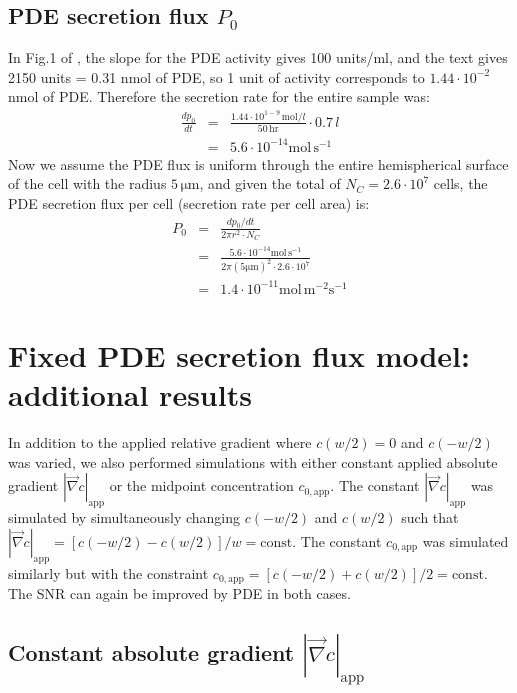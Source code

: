 \documentclass[10pt]{article}
\begin{document}
\subsection{PDE secretion flux $P_0$}

In Fig.1 of \cite{PdePdiKd}, the slope for the PDE activity gives
100 units/ml, and the text gives 2150 units = 0.31 nmol of PDE, so
1 unit of activity corresponds to $1.44\cdot10^{-2}$ nmol of PDE.
Therefore the secretion rate for the entire sample was: 
\begin{eqnarray*}
	\frac{dp_0}{dt} & = & \frac{1.44\cdot10^{1-9}\,\mathrm{mol}/l}{50\,\mathrm{hr}}\cdot0.7\, l \\
			 & = & 5.6\cdot10^{-14}\mathrm{mol\, s^{-1}}
\end{eqnarray*}
Now we assume the PDE flux is uniform through the entire hemispherical
surface of the cell with the radius $5\,\mathrm{\mu m}$, and given
the total of $N_{C}=2.6\cdot10^{7}$ cells, the PDE secretion flux
per cell (secretion rate per cell area) is: 
\begin{eqnarray*}
	P_0 & = & \frac{dp_0/dt}{2\pi r^{2}\cdot N_C} \\
      & = & \frac{5.6\cdot10^{-14}\mathrm{mol\, s^{-1}}}{2\pi(5\mathrm{\mu m})^{2}\cdot2.6\cdot10^{7}} \\
	    & = & 1.4\cdot10^{-11}\mathrm{mol\, m^{-2}s^{-1}}
\end{eqnarray*}


\newpage


\section{Fixed PDE secretion flux model: additional results}


In addition to the applied relative gradient where $c(w/2)=0$ and $c(-w/2)$ was varied, we also performed simulations with either constant applied absolute gradient $|\vec{\nabla}c|_{\mathrm{app}}$ or the midpoint concentration $c_{0, \mathrm{app}}$. The constant $|\vec{\nabla}c|_{\mathrm{app}}$ was simulated by simultaneously changing $c(-w/2)$ and $c(w/2)$ such that $|\vec{\nabla}c|_{\mathrm{app}} = [c(-w/2) - c(w/2)]/w = \mathrm{const}$. The constant $c_{0, \mathrm{app}}$ was simulated similarly but with the constraint $c_{0, \mathrm{app}} = [c(-w/2) + c(w/2)]/2 = \mathrm{const}$. The SNR can again be improved by PDE in both cases.

\subsection{Constant absolute gradient $|\vec{\nabla}c|_{\mathrm{app}}$}
\end{document}
